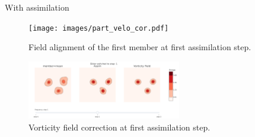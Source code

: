 \documentclass[aspectratio=169]{beamer} %
\begin{document}
\begin{frame}{With assimilation}
    \begin{figure}
        \centering
        \texttt{[image: images/part\_velo\_cor.pdf]}
        \caption*{\tiny Field alignment of the first member at first assimilation step.}
    \end{figure}
    \begin{figure}
        \centering
        \includegraphics[width=0.6\textwidth]{images/mean_vorticity.pdf}
        \caption*{\tiny Vorticity field correction at first assimilation step.}
    \end{figure}
\end{frame}
\end{document}
